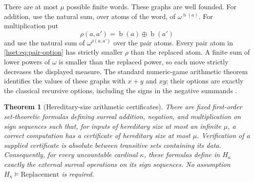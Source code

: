 \documentclass[11pt,letterpaper]{article}
\newtheorem{theorem}{Theorem}[section]
\theoremstyle{definition}
\theoremstyle{remark}
\newcommand{\bd}{\operatorname{b}}
\newcommand{\nsum}{\mathbin{\oplus}}
\begin{document}
There are at most $\mu$ possible finite words. These graphs are well founded.
For addition, use the natural sum, over atoms of the word, of
$\omega^{\bd(a)}$. For multiplication put
\[
 \rho(a,a')=\bd(a)\nsum\bd(a')
\]
and use the natural sum of $\omega^{\rho(a,a')}$ over the pair atoms.
Every pair atom in \eqref{hset:eq:pair-option} has strictly smaller $\rho$ than
the replaced atom. A finite sum of lower powers of $\omega$ is smaller than the
replaced power, so each move strictly decreases the displayed measure.
The standard numeric-game arithmetic theorem identifies the values of these
graphs with $x+y$ and $xy$; their options are exactly the classical recursive
options, including the signs in the negative summands \cite{Conway}.

\begin{theorem}[Hereditary-size arithmetic certificates]
\label{hset:thm:certificates}
There are fixed first-order set-theoretic formulas defining surreal addition,
negation, and multiplication on sign sequences such that, for inputs of
hereditary size at most an infinite $\mu$, a correct computation has a
certificate of hereditary size at most $\mu$. Verification of a supplied
certificate is absolute between transitive sets containing its data.
Consequently, for every uncountable cardinal $\kappa$, these formulas define
in $H_\kappa$ exactly the external surreal operations on its sign sequences.
No assumption $H_\kappa\models\mathrm{Replacement}$ is required.
\end{theorem}
\end{document}
